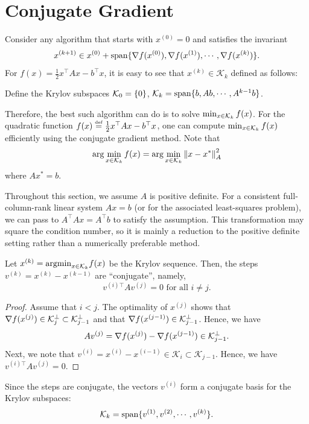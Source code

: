 %

\section{Conjugate Gradient}

Consider any algorithm that starts with $x^{(0)}=0$ and satisfies
the invariant
\[
x^{(k+1)}\in x^{(0)}+\mathrm{span}\{\nabla f(x^{(0)}),\nabla f(x^{(1)}),\cdots,\nabla f(x^{(k)})\}.
\]
For $f(x)=\frac{1}{2}x^{\top}Ax-b^{\top}x$, it is easy to see that
$x^{(k)}\in\mathcal{K}_{k}$ defined as follows:
\begin{defn}
Define the Krylov subspaces $\mathcal{K}_{0}=\{0\}$, $\mathcal{K}_{k}=\mathrm{span}\{b,Ab,\cdots,A^{k-1}b\}$.
\end{defn}

Therefore, the best such algorithm can do is to solve $\min_{x\in\mathcal{K}_{k}}f(x)$.
For the quadratic function $f(x)\stackrel{\mathrm{{\scriptscriptstyle def}}}{=}\frac{1}{2}x^{\top}Ax-b^{\top}x$,
one can compute $\min_{x\in\mathcal{K}_{k}}f(x)$ efficiently using the conjugate
gradient method. Note that 
\[
\arg\min_{x\in\mathcal{K}_{k}}f(x)=\arg\min_{x\in\mathcal{K}_{k}}\left\Vert x-x^{*}\right\Vert^{2}_{A}
\]
where $Ax^{*}=b$.

Throughout this section, we assume $A$ is positive definite. For
a consistent full-column-rank linear system $Ax=b$ (or for the associated
least-squares problem), we can pass to $A^{\top}Ax=A^{\top}b$ to
satisfy the assumption. This transformation may square the condition
number, so it is mainly a reduction to the positive definite setting
rather than a numerically preferable method.
\begin{lem}
Let $x^{(k)}=\mathrm{argmin}_{x\in\mathcal{K}_{k}}f(x)$ be the Krylov sequence. Then,
the steps $v^{(k)}=x^{(k)}-x^{(k-1)}$ are ``conjugate'', namely,
\[
v^{(i)\top}Av^{(j)}=0\text{ for all }i\neq j.
\]
\end{lem}

\begin{proof}
Assume that $i<j$. The optimality of $x^{(j)}$ shows that $\nabla f(x^{(j)})\in\mathcal{K}^{\perp}_{j}\subset\mathcal{K}^{\perp}_{j-1}$
and that $\nabla f(x^{(j-1)})\in\mathcal{K}^{\perp}_{j-1}$. Hence, we have
\[
Av^{(j)}=\nabla f(x^{(j)})-\nabla f(x^{(j-1)})\in\mathcal{K}^{\perp}_{j-1}.
\]
Next, we note that $v^{(i)}=x^{(i)}-x^{(i-1)}\in\mathcal{K}_{i}\subset\mathcal{K}_{j-1}$.
Hence, we have $v^{(i)\top}Av^{(j)}=0$.
\end{proof}
Since the steps are conjugate, the vectors $v^{(i)}$ form a conjugate
basis for the Krylov subspaces:
\[
\mathcal{K}_{k}=\mathrm{span}\{v^{(1)},v^{(2)},\cdots,v^{(k)}\}.
\]

